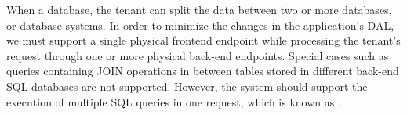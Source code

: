 When  a database, the tenant can split the data between two or more databases, or database systems. In order to minimize the changes in the application's DAL, we must support a single physical frontend endpoint while processing the tenant's request through one or more physical back-end endpoints. Special cases such as queries containing JOIN operations in between tables stored in different back-end \ac{SQL} databases are not supported. However, the system should support the execution of multiple \ac{SQL} queries in one request, which is known as .

\FloatBarrier